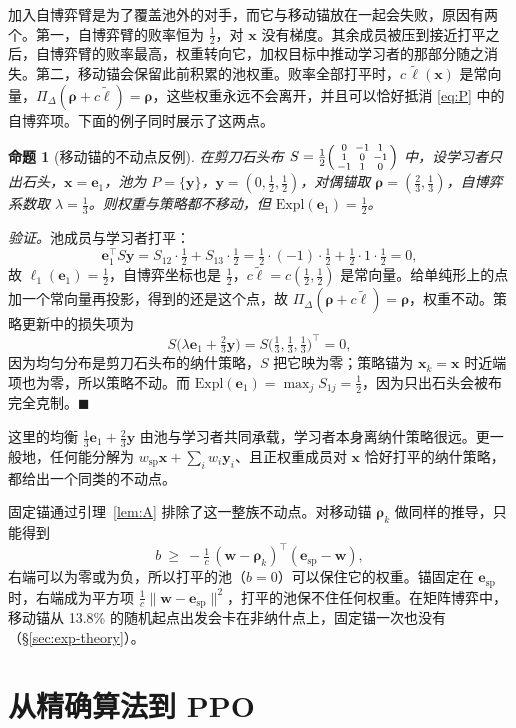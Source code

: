 \documentclass{article}
\theoremstyle{plain}
\newtheorem{proposition}[theorem]{命题}
\theoremstyle{remark}
\newcommand{\Expl}{\mathrm{Expl}}
\newcommand{\Proj}{\Pi}
\newcommand{\simplex}{\Delta}
\newcommand{\bx}{{\bm{x}}}
\newcommand{\by}{{\bm{y}}}
\newcommand{\bw}{{\bm{w}}}
\newcommand{\be}{{\bm{e}}}
\newcommand{\brho}{{\bm{\rho}}}
\newcommand{\bell}{{\bm{\ell}}}
\newcommand{\aug}{\tilde{\bell}}
\newcommand{\esp}{\be_{\mathrm{sp}}}
\newcommand{\wsp}{w_{\mathrm{sp}}}
\begin{document}
加入自博弈臂是为了覆盖池外的对手，而它与移动锚放在一起会失败，原因有两个。第一，自博弈臂的败率恒为 $\tfrac12$，对 $\bx$ 没有梯度。其余成员被压到接近打平之后，自博弈臂的败率最高，权重转向它，加权目标中推动学习者的那部分随之消失。第二，移动锚会保留此前积累的池权重。败率全部打平时，$c\,\aug(\bx)$ 是常向量，$\Proj_\simplex(\brho+c\aug)=\brho$，这些权重永远不会离开，并且可以恰好抵消 \eqref{eq:P} 中的自博弈项。下面的例子同时展示了这两点。

\begin{proposition}[移动锚的不动点反例]
\label{prop:rps}
在剪刀石头布 $S=\tfrac12\begin{psmallmatrix}0&-1&1\\1&0&-1\\-1&1&0\end{psmallmatrix}$ 中，设学习者只出石头，$\bx=\be_1$，池为 $P=\{\by\}$，$\by=(0,\tfrac12,\tfrac12)$，对偶锚取 $\brho=(\tfrac23,\tfrac13)$，自博弈系数取 $\lambda=\tfrac13$。则权重与策略都不移动，但 $\Expl(\be_1)=\tfrac12$。
\end{proposition}
\textit{验证。}池成员与学习者打平：
\[
\be_1^\top S\by=S_{12}\cdot\tfrac12+S_{13}\cdot\tfrac12=\tfrac12\cdot(-1)\cdot\tfrac12+\tfrac12\cdot1\cdot\tfrac12=0 ,
\]
故 $\ell_1(\be_1)=\tfrac12$，自博弈坐标也是 $\tfrac12$，$c\aug=c(\tfrac12,\tfrac12)$ 是常向量。给单纯形上的点加一个常向量再投影，得到的还是这个点，故 $\Proj_\simplex(\brho+c\aug)=\brho$，权重不动。策略更新中的损失项为
\[
S\big(\lambda \be_1+\tfrac23\by\big)=S\big(\tfrac13,\tfrac13,\tfrac13\big)^\top=0 ,
\]
因为均匀分布是剪刀石头布的纳什策略，$S$ 把它映为零；策略锚为 $\bx_k=\bx$ 时近端项也为零，所以策略不动。而 $\Expl(\be_1)=\max_jS_{1j}=\tfrac12$，因为只出石头会被布完全克制。\hfill$\blacksquare$

这里的均衡 $\tfrac13\be_1+\tfrac23\by$ 由池与学习者共同承载，学习者本身离纳什策略很远。更一般地，任何能分解为 $\wsp\bx+\sum_iw_i\by_i$、且正权重成员对 $\bx$ 恰好打平的纳什策略，都给出一个同类的不动点。

固定锚通过引理~\ref{lem:A} 排除了这一整族不动点。对移动锚 $\brho_k$ 做同样的推导，只能得到
\[
b\ \ge\ -\tfrac1c\,(\bw-\brho_k)^\top(\esp-\bw),
\]
右端可以为零或为负，所以打平的池（$b=0$）可以保住它的权重。锚固定在 $\esp$ 时，右端成为平方项 $\tfrac1c\|\bw-\esp\|^2$，打平的池保不住任何权重。在矩阵博弈中，移动锚从 13.8\% 的随机起点出发会卡在非纳什点上，固定锚一次也没有（\S\ref{sec:exp-theory}）。

\section{从精确算法到 PPO}
\label{sec:impl}
\end{document}
